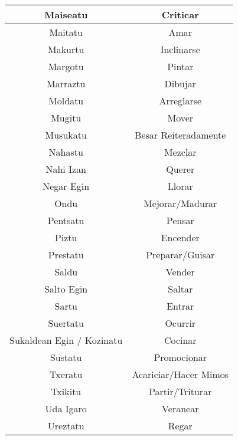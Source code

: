 \documentclass[11pt, a4paper]{article}
\begin{document}
\begin{longtable}{cc}
\hline
Maiseatu                   & Criticar                    \\ 
\hline
Maitatu                    & Amar                        \\ 
\hline
Makurtu                    & Inclinarse                  \\ 
\hline
Margotu                    & Pintar                      \\ 
\hline
Marraztu                   & Dibujar                     \\ 
\hline
Moldatu                    & Arreglarse                  \\ 
\hline
Mugitu                     & Mover                       \\ 
\hline
Musukatu                   & Besar Reiteradamente        \\ 
\hline
Nahastu                    & Mezclar                     \\ 
\hline
Nahi Izan                  & Querer                      \\ 
\hline
Negar Egin                 & Llorar                      \\ 
\hline
Ondu                       & Mejorar/Madurar             \\ 
\hline
Pentsatu                   & Pensar                      \\ 
\hline
Piztu                      & Encender                    \\ 
\hline
Prestatu                   & Preparar/Guisar             \\ 
\hline
Saldu                      & Vender                      \\ 
\hline
Salto Egin                 & Saltar                      \\ 
\hline
Sartu                      & Entrar                      \\ 
\hline
Suertatu                   & Ocurrir                     \\ 
\hline
Sukaldean Egin / Kozinatu  & Cocinar                     \\ 
\hline
Sustatu                    & Promocionar                 \\ 
\hline
Txeratu                    & Acariciar/Hacer Mimos       \\ 
\hline
Txikitu                    & Partir/Triturar             \\ 
\hline
Uda Igaro                  & Veranear                    \\ 
\hline
Ureztatu                   & Regar                       \\ 

\end{longtable}
\end{document}
